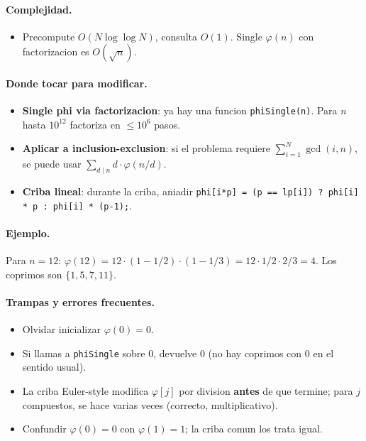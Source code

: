 \paragraph{Complejidad.}
\begin{itemize}\setlength\itemsep{0pt}
	\item Precompute $O(N \log \log N)$, consulta $O(1)$. Single $\varphi(n)$ con factorizacion es $O(\sqrt{n})$.
\end{itemize}

\paragraph{Donde tocar para modificar.}
\begin{itemize}\setlength\itemsep{0pt}
	\item \textbf{Single phi via factorizacion}: ya hay una funcion \texttt{phiSingle(n)}. Para $n$ hasta $10^{12}$ factoriza en $\le 10^6$ pasos.
	\item \textbf{Aplicar a inclusion-exclusion}: si el problema requiere $\sum_{i=1}^{N} \gcd(i, n)$, se puede usar $\sum_{d \mid n} d \cdot \varphi(n/d)$.
	\item \textbf{Criba lineal}: durante la criba, aniadir \texttt{phi[i*p] = (p == lp[i]) ? phi[i] * p : phi[i] * (p-1);}.
\end{itemize}

\paragraph{Ejemplo.}
Para $n = 12$: $\varphi(12) = 12 \cdot (1 - 1/2) \cdot (1 - 1/3) = 12 \cdot 1/2 \cdot 2/3 = 4$. Los coprimos son $\{1, 5, 7, 11\}$.

\paragraph{Trampas y errores frecuentes.}
\begin{itemize}\setlength\itemsep{0pt}
	\item Olvidar inicializar $\varphi(0) = 0$.
	\item Si llamas a \texttt{phiSingle} sobre 0, devuelve 0 (no hay coprimos con 0 en el sentido usual).
	\item La criba Euler-style modifica $\varphi[j]$ por division \textbf{antes} de que termine; para $j$ compuestos, se hace varias veces (correcto, multiplicativo).
	\item Confundir $\varphi(0) = 0$ con $\varphi(1) = 1$; la criba comun los trata igual.
\end{itemize}

